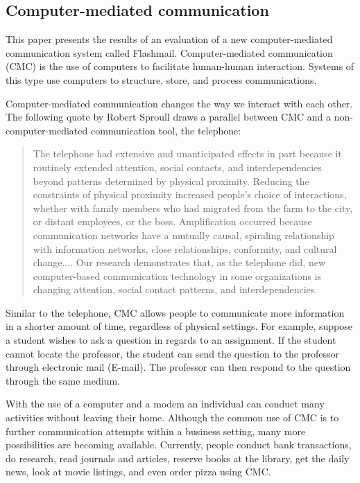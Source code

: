 \subsection{Computer-mediated communication} 
This paper presents the results of an evaluation of a new computer-mediated
communication system called Flashmail. Computer-mediated communication
(CMC) is the use of computers to facilitate human-human interaction.
Systems of this type use computers to structure, store, and process
communications.  

Computer-mediated communication changes the way we interact with each
other.  The following quote by Robert Sproull draws a parallel between CMC
and a non-computer-mediated communication tool, the telephone:

\begin{quote}
  The telephone had extensive and unanticipated effects in part because it
  routinely extended attention, social contacts, and interdependencies
  beyond patterns determined by physical proximity. Reducing the
  constraints of physical proximity increased people's choice of
  interactions, whether with family members who had migrated from the farm
  to the city, or distant employees, or the boss. Amplification occurred
  because communication networks have a mutually causal, spiraling
  relationship with information networks, close relationships, conformity,
  and cultural change.... Our research demonstrates that, as the telephone
  did, new computer-based communication technology in some organizations is
  changing attention, social contact patterns, and interdependencies.
  \cite{Sproull93}
\end{quote}

Similar to the telephone, CMC allows people to communicate more information
in a shorter amount of time, regardless of physical settings.  For example,
suppose a student wishes to ask a question in regards to an assignment.  If
the student cannot locate the professor, the student can send the question
to the professor through electronic mail (E-mail).  The professor can then
respond to the question through the same medium.

With the use of a computer and a modem an individual can conduct many
activities without leaving their home.  Although the common use of CMC is
to further communication attempts within a business setting, many more
possibilities are becoming available.  Currently, people conduct bank
transactions, do research, read journals and articles, reserve books at the
library, get the daily news, look at movie listings, and even order pizza
using CMC.

